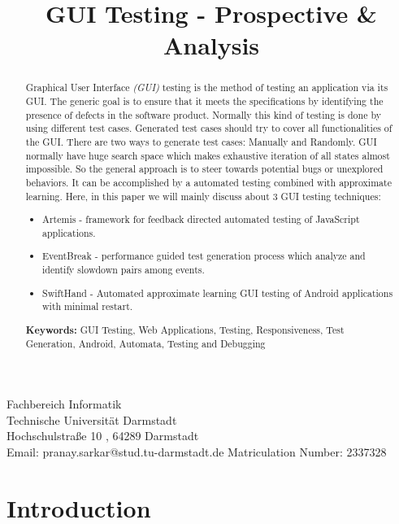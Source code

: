 \documentclass[authoryear,preprint, twocolumn]{sigplanconf}
\begin{document}
\setlength{\pdfpageheight}{\paperheight}
\setlength{\pdfpagewidth}{\paperwidth}


\title{GUI Testing - Prospective \& Analysis}

{Fachbereich Informatik\\
		Technische Universit{\"a}t Darmstadt\\
		Hochschulstra{\ss}e 10 , 64289 Darmstadt\\
		Email: pranay.sarkar@stud.tu-darmstadt.de}
	{Matriculation Number: 2337328}
\maketitle

\begin{abstract}
Graphical User Interface \emph{(GUI)} testing is the method of testing an application via its GUI. The generic goal is to ensure that it meets the specifications by identifying the presence of defects in the software product. Normally this kind of testing is done by using different test cases. Generated test cases should try to cover all functionalities of the GUI. There are two ways to generate test cases: Manually and Randomly. GUI normally have huge search space which makes exhaustive iteration of all states almost impossible. So the general approach is to steer towards potential bugs or unexplored behaviors. It can be accomplished by a automated testing combined with approximate learning. Here, in this paper we will mainly discuss about 3 GUI testing techniques:
\begin{itemize}
	\item Artemis - framework for feedback directed automated testing of JavaScript applications.
	\item EventBreak - performance guided test generation process which analyze and identify slowdown pairs among events.
	\item SwiftHand - Automated approximate learning GUI testing of Android applications with minimal restart.
\end{itemize}

{\bf Keywords:} GUI Testing, Web Applications, Testing, Responsiveness, Test Generation, Android, Automata, Testing and Debugging
\end{abstract}




\section{Introduction}
\label{sec:introduction}
\end{document}
